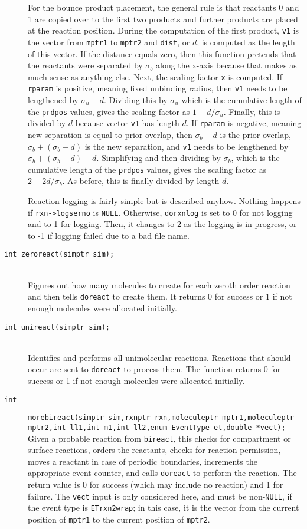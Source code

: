 \documentclass {book}
\newcommand {\ttt} {\texttt}
\begin{document}
\begin{description}
For the bounce product placement, the general rule is that reactants 0 and 1 are copied over to the first two products and further products are placed at the reaction position. During the computation of the first product, \ttt{v1} is the vector from \ttt{mptr1} to \ttt{mptr2} and \ttt{dist}, or $d$, is computed as the length of this vector. If the distance equals zero, then this function pretends that the reactants were separated by $\sigma_b$ along the x-axis because that makes as much sense as anything else. Next, the scaling factor \ttt{x} is computed. If \ttt{rparam} is positive, meaning fixed unbinding radius, then \ttt{v1} needs to be lengthened by $\sigma_u-d$. Dividing this by $\sigma_u$ which is the cumulative length of the \ttt{prdpos} values, gives the scaling factor as $1-d/\sigma_u$. Finally, this is divided by $d$ because vector \ttt{v1} has length $d$. If \ttt{rparam} is negative, meaning new separation is equal to prior overlap, then $\sigma_b-d$ is the prior overlap, $\sigma_b+(\sigma_b-d)$ is the new separation, and \ttt{v1} needs to be lengthened by $\sigma_b+(\sigma_b-d)-d$. Simplifying and then dividing by $\sigma_b$, which is the cumulative length of the \ttt{prdpos} values, gives the scaling factor as $2-2d/\sigma_b$. As before, this is finally divided by length $d$.

Reaction logging is fairly simple but is described anyhow. Nothing happens if \ttt{rxn->logserno} is \ttt{NULL}. Otherwise, \ttt{dorxnlog} is set to 0 for not logging and to 1 for logging. Then, it changes to 2 as the logging is in progress, or to -1 if logging failed due to a bad file name.

\item[\ttt{int zeroreact(simptr sim);}]
\hfill \\
Figures out how many molecules to create for each zeroth order reaction and then tells \ttt{doreact} to create them. It returns 0 for success or 1 if not enough molecules were allocated initially.

\item[\ttt{int unireact(simptr sim);}]
\hfill \\
Identifies and performs all unimolecular reactions. Reactions that should occur are sent to \ttt{doreact} to process them. The function returns 0 for success or 1 if not enough molecules were allocated initially.

\item[\ttt{int}]
\ttt{morebireact(simptr sim,rxnptr rxn,moleculeptr mptr1,moleculeptr mptr2,int ll1,int m1,int ll2,enum EventType et,double *vect);} \\
Given a probable reaction from \ttt{bireact}, this checks for compartment or surface reactions, orders the reactants, checks for reaction permission, moves a reactant in case of periodic boundaries, increments the appropriate event counter, and calls \ttt{doreact} to perform the reaction. The return value is 0 for success (which may include no reaction) and 1 for failure. The \ttt{vect} input is only considered here, and must be non-\ttt{NULL}, if the event type is \ttt{ETrxn2wrap}; in this case, it is the vector from the current position of \ttt{mptr1} to the current position of \ttt{mptr2}.


\end{description}
\end{document}
